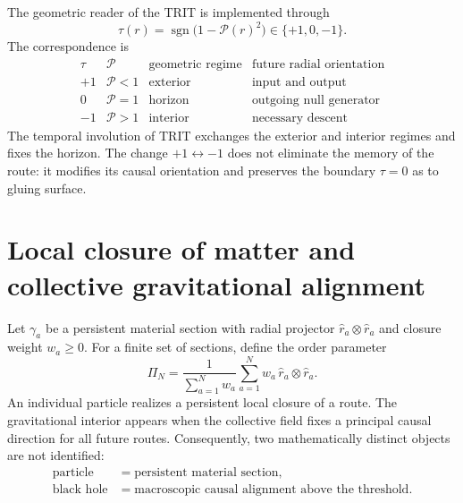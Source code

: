 The geometric reader of the TRIT is implemented through
\begin{equation}
 \tau(r)=\operatorname{sgn}\!\bigl(1-\mathcal P(r)^2\bigr)
 \in\{+1,0,-1\}.
 \label{eq:md-polarizacion-lector-trit}
\end{equation}
The correspondence is
\begin{equation}
 \begin{array}{c|c|c|c}
 \tau & \mathcal P & \text{geometric regime} &
 \text{future radial orientation}\\ \hline
 +1 & \mathcal P<1 & \text{exterior} & \text{input and output}\\
 0  & \mathcal P=1 & \text{horizon} & \text{outgoing null generator}\\
 -1 & \mathcal P>1 & \text{interior} & \text{necessary descent}
 \end{array}
 \label{eq:md-polarizacion-tabla-trit}
\end{equation}
The temporal involution of TRIT exchanges the exterior and interior regimes
and fixes the horizon. The change \(+1\leftrightarrow-1\) does not eliminate the memory
of the route: it modifies its causal orientation and preserves the boundary
\(\tau=0\) as to gluing surface.

\section{Local closure of matter and collective gravitational alignment}
\label{sec:md-polarizacion-materia}

Let \(\gamma_a\) be a persistent material section with radial projector
\(\widehat r_a\otimes\widehat r_a\) and closure weight \(w_a\geq0\). For a
finite set of sections, define the order parameter
\begin{equation}
 \Pi_N
 =\frac{1}{\sum_{a=1}^{N}w_a}
  \sum_{a=1}^{N}w_a\,
  \widehat r_a\otimes\widehat r_a.
 \label{eq:md-polarizacion-colectiva}
\end{equation}
An individual particle realizes a persistent local closure of a route. The
gravitational interior appears when the collective field fixes a principal
causal direction for all future routes. Consequently, two
mathematically distinct objects are not identified:
\begin{equation}
\begin{aligned}
 \text{particle}
 &=\text{persistent material section},\\
 \text{black hole}
 &=\text{macroscopic causal alignment above the threshold}.
\end{aligned}
 \label{eq:md-polarizacion-distincion}
\end{equation}

